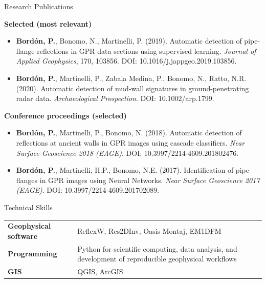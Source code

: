 \documentclass{resume}
\begin{document}
\begin{rSection}{Research Publications}

\textbf{Selected (most relevant)}
\begin{itemize}
  \item \textbf{Bord{\'o}n, P.}, Bonomo, N., Martinelli, P. (2019). Automatic detection of pipe-flange reflections in GPR data sections using supervised learning. \emph{Journal of Applied Geophysics}, 170, 103856. DOI: 10.1016/j.jappgeo.2019.103856.
  \item \textbf{Bord{\'o}n, P.}, Martinelli, P., Zabala Medina, P., Bonomo, N., Ratto, N.R. (2020). Automatic detection of mud-wall signatures in ground-penetrating radar data. \emph{Archaeological Prospection}. DOI: 10.1002/arp.1799.
\end{itemize}

\vspace{2pt}
\textbf{Conference proceedings (selected)}
\begin{itemize}
  \item \textbf{Bord{\'o}n, P.}, Martinelli, P., Bonomo, N. (2018). Automatic detection of reflections at ancient walls in GPR images using cascade classifiers. \emph{Near Surface Geoscience 2018 (EAGE)}. DOI: 10.3997/2214-4609.201802476.
  \item \textbf{Bord{\'o}n, P.}, Martinelli, H.P., Bonomo, N.E. (2017). Identification of pipe flanges in GPR images using Neural Networks. \emph{Near Surface Geoscience 2017 (EAGE)}. DOI: 10.3997/2214-4609.201702089.
\end{itemize}


\end{rSection}

\begin{rSection}{Technical Skills}
\begin{tabular}{ @{} >{\bfseries}l @{\hspace{5ex}} p{} }
Geophysical software & ReflexW, Res2DInv, Oasis Montaj, EM1DFM \\
Programming & Python for scientific computing, data analysis, and development of reproducible geophysical workflows \\
GIS & QGIS, ArcGIS \\
\end{tabular}
\end{rSection}
\end{document}
